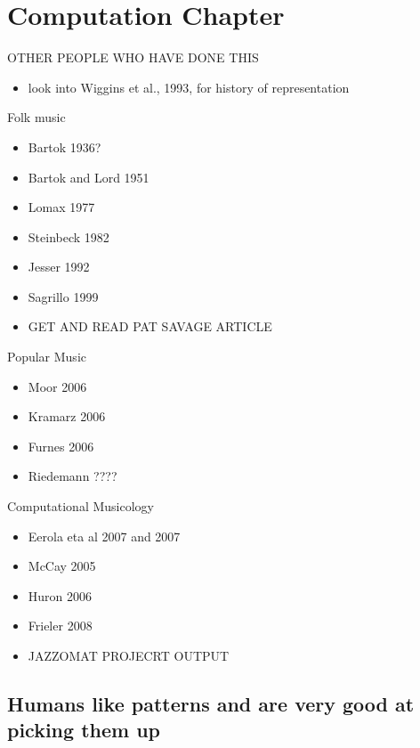 \documentclass[]{book}
\providecommand{\tightlist}{%
  \setlength{\itemsep}{0pt}\setlength{\parskip}{0pt}}
\theoremstyle{definition}
\theoremstyle{definition}
\theoremstyle{definition}
\theoremstyle{remark}
\begin{document}
\hypertarget{computation-chapter}{%
\chapter{Computation Chapter}\label{computation-chapter}}

OTHER PEOPLE WHO HAVE DONE THIS

\begin{itemize}
\tightlist
\item
  look into Wiggins et al., 1993, for history of representation
\end{itemize}

Folk music

\begin{itemize}
\item
  Bartok 1936?
\item
  Bartok and Lord 1951
\item
  Lomax 1977
\item
  Steinbeck 1982
\item
  Jesser 1992
\item
  Sagrillo 1999
\item
  GET AND READ PAT SAVAGE ARTICLE
\end{itemize}

Popular Music

\begin{itemize}
\tightlist
\item
  Moor 2006
\item
  Kramarz 2006
\item
  Furnes 2006
\item
  Riedemann ????
\end{itemize}

Computational Musicology

\begin{itemize}
\tightlist
\item
  Eerola eta al 2007 and 2007
\item
  McCay 2005
\item
  Huron 2006
\item
  Frieler 2008
\item
  JAZZOMAT PROJECRT OUTPUT
\end{itemize}

\hypertarget{humans-like-patterns-and-are-very-good-at-picking-them-up}{%
\section{Humans like patterns and are very good at picking them
up}\label{humans-like-patterns-and-are-very-good-at-picking-them-up}}
\end{document}

